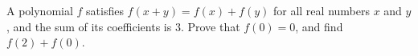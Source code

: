 A polynomial $f$ satisfies $f(x+y)=f(x)+f(y)$ for all real numbers $x$ and $y$, and the sum of its coefficients is $3$. Prove that $f(0)=0$, and find $f(2)+f(0)$.
